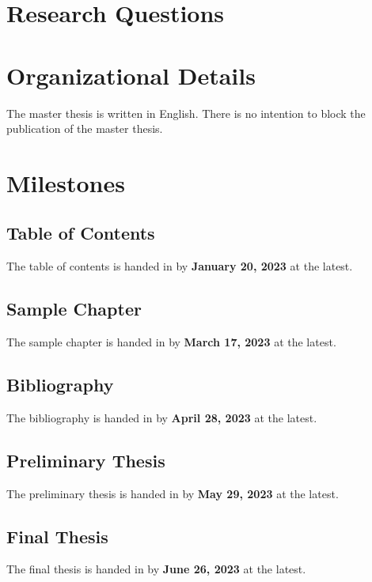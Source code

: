 \documentclass[english,notitlepage,smartquotes]{hgbreport}
\begin{document}
\section{Research Questions}


\section{Organizational Details}

The master thesis is written in English.
There is no intention to block the publication of the master thesis.

\section{Milestones}

\subsection{Table of Contents}

The table of contents is handed in by \textbf{January 20, 2023} at the latest.

\subsection{Sample Chapter}

The sample chapter is handed in by \textbf{March 17, 2023} at the latest.

\subsection{Bibliography}

The bibliography is handed in by \textbf{April 28, 2023} at the latest.

\subsection{Preliminary Thesis}

The preliminary thesis is handed in by \textbf{May 29, 2023} at the latest.

\subsection{Final Thesis}

The final thesis is handed in by \textbf{June 26, 2023} at the latest.
\end{document}
